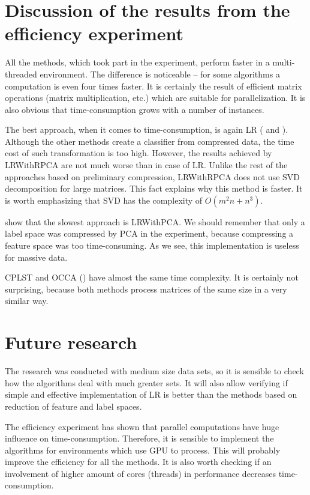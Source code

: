 \section{Discussion of the results from the efficiency experiment}

All the methods, which took part in the experiment, perform faster in a multi-threaded environment. The difference is noticeable -- for some algorithms a computation is even four times faster. It is certainly the result of efficient matrix operations (matrix multiplication, etc.) which are suitable for parallelization. It is also obvious that time-consumption grows with a number of instances.

The best approach, when it comes to time-consumption, is again LR ( and ). Although the other methods create a classifier from compressed data, the time cost of such transformation is too high. However, the results achieved by LRWithRPCA are not much worse than in case of LR. Unlike the rest of the approaches based on preliminary compression, LRWithRPCA does not use SVD decomposition for large matrices. This fact explains why this method is faster. It is worth emphasizing that SVD has the complexity of $O(m^2n+n^3)$. 

 show that the slowest approach is LRWithPCA. We should remember that only a label space was compressed by PCA in the experiment, because compressing a feature space was too time-consuming. As we see, this implementation is useless for massive data. 

CPLST and OCCA () have almost the same time complexity. It is certainly not surprising, because both methods process matrices of the same size in a very similar way.

\section{Future research}

The research was conducted with medium size data sets, so it is sensible to check how the algorithms deal with much greater sets. It will also allow verifying if simple and effective implementation of LR is better than the methods based on reduction of feature and label spaces. 

The efficiency experiment has shown that parallel computations have huge influence on time-consumption. Therefore, it is sensible to implement the algorithms for environments which use GPU to process. This will probably improve the efficiency for all the methods. It is also worth checking if an involvement of higher amount of cores (threads) in performance decreases time-consumption.  

